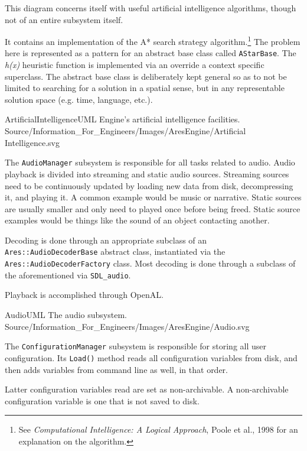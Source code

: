 This diagram concerns itself with useful artificial intelligence algorithms, though not of an entire subsystem itself.

It contains an implementation of the A* search strategy algorithm.\footnote{See {\it Computational Intelligence: A Logical Approach}, Poole et al., 1998 for an explanation on the algorithm.} The problem here is represented as a pattern for an abstract base class called {\tt AStarBase}. The {\it h(x)} heuristic function is implemented via an override a context specific superclass. The abstract base class is deliberately kept general so as to not be limited to searching for a solution in a spatial sense, but in any representable solution space (e.g. time, language, etc.).

\FullPageLandscapeDiagram
    {ArtificialIntelligenceUML}
    {Engine's artificial intelligence facilities.}
    {Source/Information_For_Engineers/Images/AresEngine/Artificial Intelligence.svg}

\page
{}
The {\tt AudioManager} subsystem is responsible for all tasks related to audio. Audio playback is divided into streaming and static audio sources. Streaming sources need to be continuously updated by loading new data from disk, decompressing it, and playing it. A common example would be music or narrative. Static sources are usually smaller and only need to played once before being freed. Static source examples would be things like the sound of an object contacting another.

Decoding is done through an appropriate subclass of an {\tt Ares::AudioDecoderBase} abstract class, instantiated via the {\tt Ares::AudioDecoderFactory} class. Most decoding is done through a subclass of the aforementioned via {\tt SDL_audio}.

Playback is accomplished through OpenAL.

\FullPageLandscapeDiagram
    {AudioUML}
    {The audio subsystem.}
    {Source/Information_For_Engineers/Images/AresEngine/Audio.svg}

\page
{}
The {\tt ConfigurationManager} subsystem is responsible for storing all user configuration. Its {\tt Load()} method reads all configuration variables from disk, and then adds variables from command line as well, in that order. 

Latter configuration variables read are set as non-archivable. A non-archivable configuration variable is one that is not saved to disk.

